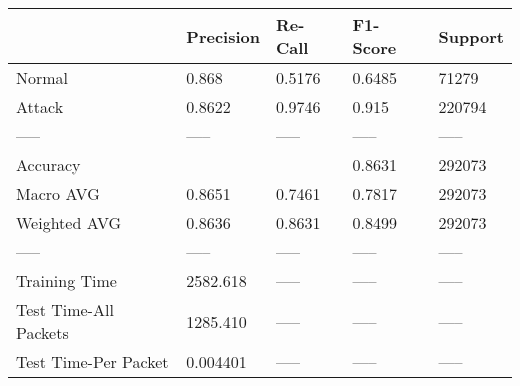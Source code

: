 \begin{tabular}{lllll}
\toprule
{} & Precision & Re-Call & F1-Score & Support \\
\midrule
Normal                &     0.868 &  0.5176 &   0.6485 &   71279 \\
Attack                &    0.8622 &  0.9746 &    0.915 &  220794 \\
-----                 &     ----- &   ----- &    ----- &   ----- \\
Accuracy              &           &         &   0.8631 &  292073 \\
Macro AVG             &    0.8651 &  0.7461 &   0.7817 &  292073 \\
Weighted AVG          &    0.8636 &  0.8631 &   0.8499 &  292073 \\
-----                 &     ----- &   ----- &    ----- &   ----- \\
Training Time         &  2582.618 &   ----- &    ----- &   ----- \\
Test Time-All Packets &  1285.410 &   ----- &    ----- &   ----- \\
Test Time-Per Packet  &  0.004401 &   ----- &    ----- &   ----- \\
\bottomrule
\end{tabular}
